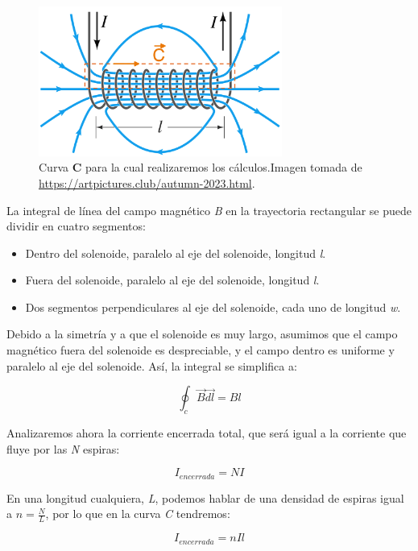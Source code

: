 \begin{figure}[H]
    \centering %
    \includegraphics[width=8cm]{FigurasMemoria/integralampere.png}
    \caption{Curva \textbf{C} para la cual realizaremos los cálculos.Imagen tomada de \href{URL}{https://artpictures.club/autumn-2023.html}.}
    \label{fig:integralampere} %
\end{figure}

La integral de línea del campo magnético \textit{B} en la trayectoria rectangular se puede dividir en cuatro segmentos:
\begin{itemize}
    \item Dentro del solenoide, paralelo al eje del solenoide, longitud \textit{l}.
    \item Fuera del solenoide, paralelo al eje del solenoide, longitud \textit{l}.
    \item Dos segmentos perpendiculares al eje del solenoide, cada uno de longitud \textit{w}.
\end{itemize}

Debido a la simetría y a que el solenoide es muy largo, asumimos que el campo magnético fuera del solenoide es despreciable, y el campo dentro es uniforme y paralelo al eje del solenoide. Así, la integral se simplifica a:

\begin{center}
    \[\oint_c\vec{B} \vec{dl}=Bl\]
\end{center}

Analizaremos ahora la corriente encerrada total, que será igual a la corriente que fluye por las \textit{N} espiras:

\begin{center}
    \[I_{encerrada} = NI\]
\end{center}

En una longitud cualquiera, \textit{L}, podemos hablar de una densidad de espiras igual a \(n=\frac{N}{L}\), por lo que en la curva \textit{C} tendremos:

\begin{center}
    \[I_{encerrada} = nIl\]
\end{center}

